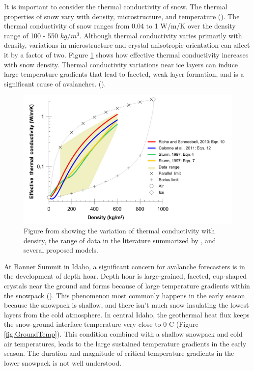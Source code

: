 It is important to consider the thermal conductivity of snow. The thermal properties of snow vary with density, microstructure, and temperature (\cite{arenson2015physical}). The thermal conductivity of snow ranges from 0.04 to 1 W/m/K over the density range of 100 - 550 $kg/m^3$. Although thermal conductivity varies primarily with density, variations in microstructure and crystal anisotropic orientation can affect it by a factor of two. Figure \ref{fig:ThermalConductivity} shows how effective thermal conductivity increases with snow density. Thermal conductivity variations near ice layers can induce large temperature gradients that lead to faceted, weak layer formation, and is a significant cause of avalanches.  (\cite{arenson2015physical}). 

 \begin{figure}[!t]
    \centering
    \includegraphics[width=0.8\linewidth]{figures/TempGrad/Density_Conductivity.png}
    \caption{Figure from \cite{arenson2015physical} showing the variation of thermal conductivity with density, the range of data in the literature summarized by \cite{sturm1997thermal}, and several proposed models.}
    \label{fig:ThermalConductivity}
 \end{figure}

At Banner Summit in Idaho, a significant concern for avalanche forecasters is in the development of depth hoar. Depth hoar is large-grained, faceted, cup-shaped crystals near the ground and forms because of large temperature gradients within the snowpack (\cite{akitaya1974}). This phenomenon most commonly happens in the early season because the snowpack is shallow, and there isn't much snow insulating the lowest layers from the cold atmosphere. In central Idaho, the geothermal heat flux keeps the snow-ground interface temperature very close to 0 \textdegree C (Figure \ref{fig:GroundTemp}). This condition combined with a shallow snowpack and cold air temperatures, leads to the large sustained temperature gradients in the early season. The duration and magnitude of critical temperature gradients in the lower snowpack is not well understood. 

